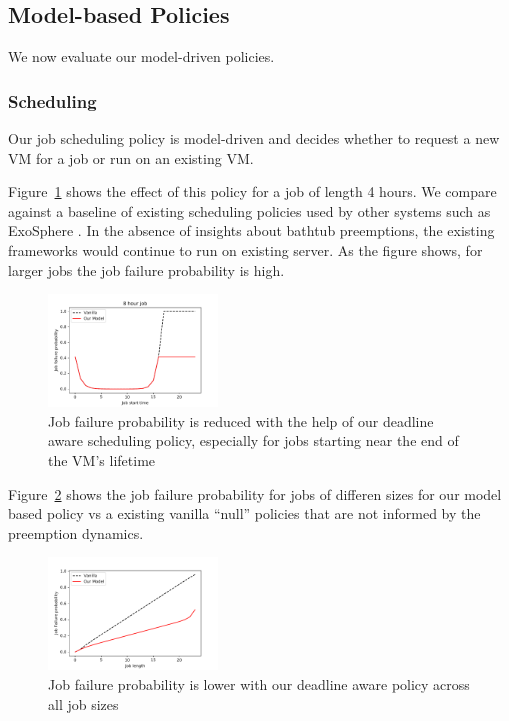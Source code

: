 \subsection{Model-based Policies}
\label{subsec:eval-policy}

We now evaluate our model-driven policies. 


\subsubsection{Scheduling}

Our job scheduling policy is model-driven and decides whether to request a new VM for a job or run on an existing VM.

Figure~\ref{fig:sched-bathtub} shows the effect of this policy for a job of length 4 hours.
We compare against a baseline of existing scheduling policies used by other systems such as ExoSphere .
In the absence of insights about bathtub preemptions, the existing frameworks would continue to run on existing server.
As the figure shows, for larger jobs the job failure probability is high. 

\begin{figure}[t]
  \includegraphics[width=0.4\textwidth]{../graphs/Sched-bathtub.pdf}
  \caption{Job failure probability is reduced with the help of our deadline aware scheduling policy, especially for jobs starting near the end of the VM's lifetime}
  \label{fig:sched-bathtub}
\end{figure}


Figure~\ref{fig:sched-all} shows the job failure probability for jobs of differen sizes for our model based policy vs a existing vanilla ``null'' policies that are not informed by the preemption dynamics.



\begin{figure}[t]
  \includegraphics[width=0.4\textwidth]{../graphs/Sched-fail-prob.pdf}
  \caption{Job failure probability is lower with our deadline aware policy across all job sizes}
  \label{fig:sched-all}
\end{figure}



